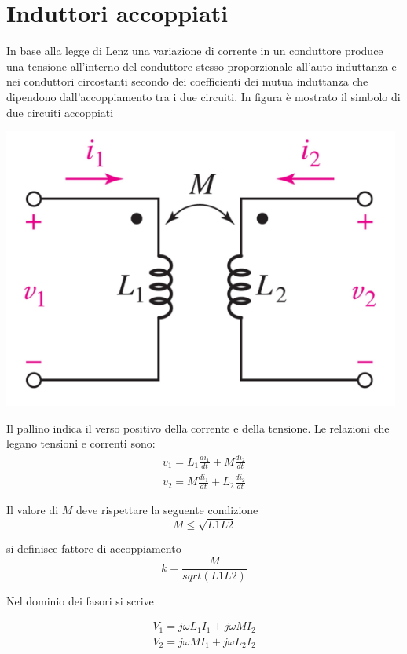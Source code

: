 \documentclass[10pt,a4paper]{book}
\begin{document}
\section{Induttori accoppiati}
In base alla legge di Lenz una variazione di corrente in un conduttore produce una tensione all'interno del conduttore stesso proporzionale all'auto induttanza e nei conduttori circostanti secondo dei coefficienti dei mutua induttanza che dipendono dall'accoppiamento tra i due circuiti. In figura è mostrato il simbolo di due circuiti accoppiati
\begin{center}
\includegraphics[scale=1]{img/risonatori/circuiti_accoppiati.png} 
\label{FIG:Circuiti_accoppiati}
\end{center}

Il pallino indica il verso positivo della corrente e della tensione.
Le relazioni che legano tensioni e correnti sono:
\begin{eqnarray}
v_1 = L_1 \frac{d i_1}{dt} + M \frac{d i_2}{dt} \\
v_2 = M \frac{d i_1}{dt} + L_2 \frac{d i_2}{dt} 
\end{eqnarray}

Il valore di $M$ deve rispettare la seguente condizione 
\begin{equation}
M \leqslant \sqrt{L1 L2}
\end{equation}

si definisce fattore di accoppiamento 
$$
k = \frac{M}{sqrt(L1 L2)}
$$

Nel dominio dei fasori si scrive

\begin{eqnarray}
V_1 = j \omega L_1 I_1 + j \omega M I_2 \\
V_2 = j \omega M   I_1 + j \omega L_2 I_2 
\end{eqnarray}
\end{document}
